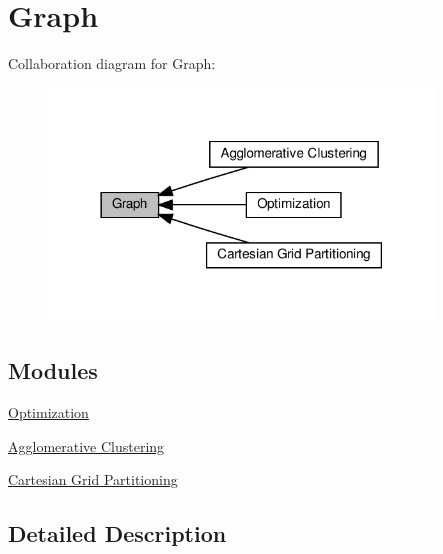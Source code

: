 \hypertarget{group__group__graph}{}\section{Graph}
\label{group__group__graph}
Collaboration diagram for Graph\+:
\nopagebreak
\begin{figure}[H]
\begin{center}
\leavevmode
\includegraphics[width=290pt]{group__group__graph}
\end{center}
\end{figure}
\subsection*{Modules}
\begin{DoxyCompactItemize}
\item 
\hyperlink{group__group__opt}{Optimization}
\item 
\hyperlink{group__group__agglo}{Agglomerative Clustering}
\item 
\hyperlink{group__group__cgp}{Cartesian Grid Partitioning}
\end{DoxyCompactItemize}


\subsection{Detailed Description}
